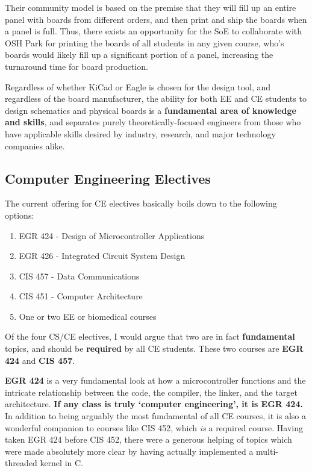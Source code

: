 \documentclass[12pt]{article}
\numberwithin{figure}{section}
\numberwithin{equation}{section}
\begin{document}
{\bigskip

Their community model is based on the premise that they will fill up an
entire panel with boards from different orders, and then print and ship
the boards when a panel is full. Thus, there exists an opportunity for
the SoE to collaborate with OSH Park for printing the boards of all
students in any given course, who's boards would likely fill up a
significant portion of a panel, increasing the turnaround time for board
production.

\bigskip

Regardless of whether KiCad or Eagle is chosen for the design tool, and
regardless of the board manufacturer, the ability for both EE and CE
students to design schematics and physical boards is a
\textbf{fundamental area of knowledge and skills}, and separates purely
theoretically-focused engineers from those who have applicable skills
desired by industry, research, and major technology companies alike.

\subsection{Computer Engineering Electives}\label{electives}
The current offering for CE electives basically boils down to the
following options:

\begin{enumerate}
\itemsep1pt\parskip0pt
\item EGR 424 - Design of Microcontroller Applications
\item EGR 426 - Integrated Circuit System Design
\item CIS 457 - Data Communications
\item CIS 451 - Computer Architecture
\item One or two EE or biomedical courses
\end{enumerate}

Of the four CS/CE electives, I would argue that two are in fact
\textbf{fundamental} topics, and should be \textbf{required} by all CE
students. These two courses are \textbf{EGR 424} and \textbf{CIS 457}.

\bigskip

\textbf{EGR 424} is a very fundamental look at how a microcontroller
functions and the intricate relationship between the code, the compiler,
the linker, and the target architecture. \textbf{If any class is truly
`computer engineering', it is EGR 424.} In addition to being arguably
the most fundamental of all CE courses, it is also a wonderful companion
to courses like CIS 452, which \emph{is} a required course. Having taken
EGR 424 before CIS 452, there were a generous helping of topics which
were made absolutely more clear by having actually implemented a
multi-threaded kernel in C.

}
\end{document}
